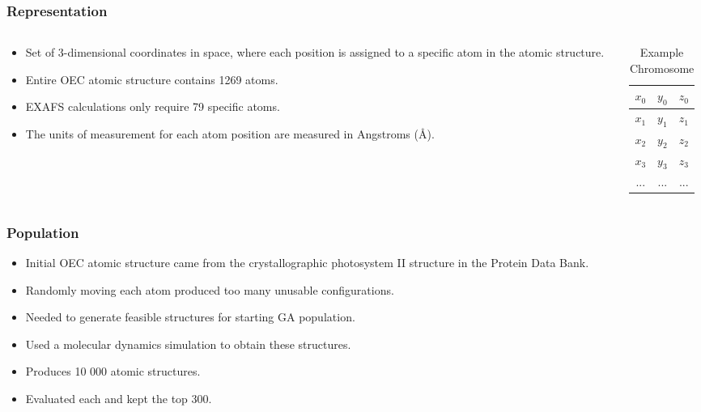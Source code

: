 \documentclass[10pt]{beamer}
\begin{document}
\begin{frame}
	\frametitle{Representation}

	\begin{columns}[T]
		\begin{column}{.6\textwidth}
			\begin{itemize}
				\item Set of 3-dimensional coordinates in space, where each position is assigned to a specific atom in the atomic structure.
				\item Entire OEC atomic structure contains 1269 atoms.
				\item EXAFS calculations only require 79 specific atoms.
				\item The units of measurement for each atom position are measured in Angstroms (\AA).
			\end{itemize}
		\end{column}
		\begin{column}{.4\textwidth}
			
			\begin{table}
				\caption{Example Chromosome}
				\begin{tabular}{ | c  c  c | }
					\hline
					$x_{0}$ & $y_{0}$ & $z_{0}$ \\ \hline
					$x_{1}$ & $y_{1}$ & $z_{1}$ \\ \hline
					$x_{2}$ & $y_{2}$ & $z_{2}$ \\ \hline
					$x_{3}$ & $y_{3}$ & $z_{3}$ \\ \hline
					... & ... & ... \\ \hline
				\end{tabular}
			\end{table}

		\end{column}
	\end{columns}

\end{frame}

\begin{frame}
	\frametitle{Population}

	\begin{itemize}
		\item Initial OEC atomic structure came from the crystallographic photosystem II structure in the Protein Data Bank.
		\item Randomly moving each atom produced too many unusable configurations.
		\item Needed to generate feasible structures for starting GA population.
		\item Used a molecular dynamics simulation to obtain these structures.
		\item Produces 10 000 atomic structures.
		\item Evaluated each and kept the top 300.
	\end{itemize}
\end{frame}
\end{document}

